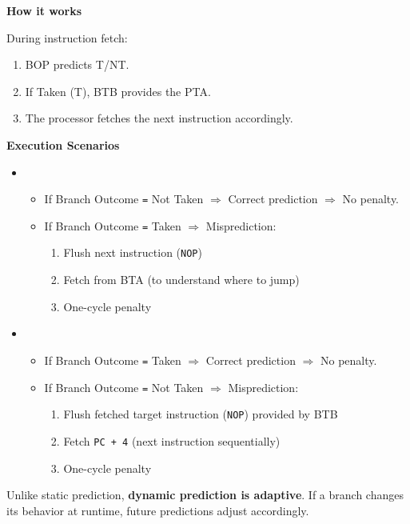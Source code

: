 \highspace
\begin{flushleft}
    \textcolor{Green3}{ \textbf{How it works}}
\end{flushleft}
During instruction fetch:
\begin{enumerate}
    \item BOP predicts T/NT.
    \item If Taken (T), BTB provides the PTA.
    \item The processor fetches the next instruction accordingly.
\end{enumerate}

\newpage

\begin{flushleft}
    \textcolor{Green3}{ \textbf{Execution Scenarios}}
\end{flushleft}
\begin{itemize}
    \item {}
    \begin{itemize}
        \item If Branch Outcome \texttt{=} Not Taken $\Rightarrow$ \textcolor{Green3}{} Correct prediction $\Rightarrow$ No penalty.
        \item If Branch Outcome \texttt{=} Taken $\Rightarrow$ \textcolor{Red2}{} Misprediction:
        \begin{enumerate}
            \item Flush next instruction (\texttt{NOP})
            \item Fetch from BTA (to understand where to jump)
            \item One-cycle penalty
        \end{enumerate}
    \end{itemize}

    \item {}
    \begin{itemize}
        \item If Branch Outcome \texttt{=} Taken $\Rightarrow$ \textcolor{Green3}{} Correct prediction $\Rightarrow$ No penalty.
        \item If Branch Outcome \texttt{=} Not Taken $\Rightarrow$ \textcolor{Red2}{} Misprediction:
        \begin{enumerate}
            \item Flush fetched target instruction (\texttt{NOP}) provided by BTB
            \item Fetch \texttt{PC + 4} (next instruction sequentially)
            \item One-cycle penalty
        \end{enumerate}
    \end{itemize}
\end{itemize}
Unlike static prediction, \textbf{dynamic prediction is adaptive}. If a branch changes its behavior at runtime, future predictions adjust accordingly.